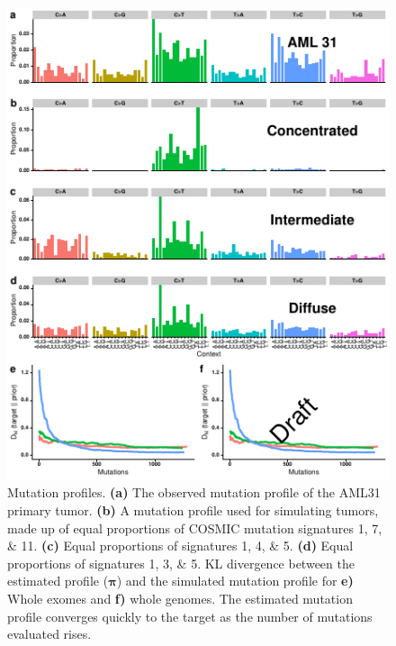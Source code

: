 \documentclass[a4,center,fleqn]{NAR}
\begin{document}
\begin{figure}[t]
  \begin{center}
  \includegraphics{figures/signature_figure.pdf}
  \end{center}
  \caption{Mutation profiles. 
  \textbf{(a)} The observed mutation profile of the AML31 primary tumor. 
  \textbf{(b)} A mutation profile used for simulating tumors, made up of equal proportions of COSMIC mutation signatures 1, 7, \& 11.
  \textbf{(c)} Equal proportions of signatures 1, 4, \& 5.
  \textbf{(d)} Equal proportions of signatures 1, 3, \& 5.
  KL divergence between the estimated profile ($\boldsymbol{\pi}$) and the simulated mutation profile for \textbf{e)} Whole exomes and \textbf{f)} whole genomes.
  The estimated mutation profile converges quickly to the target as the number of mutations evaluated rises.
  }
  \label{NAR-sigfig}
  \end{figure}
\end{document}
